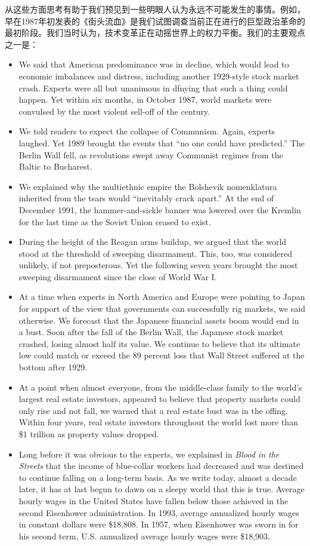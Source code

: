 \begin{paracol}{2}
	\switchcolumn*
	从这些方面思考有助于我们预见到一些明眼人认为永远不可能发生的事情。例如，早在1987年初发表的《街头流血》是我们试图调查当前正在进行的巨型政治革命的最初阶段。我们当时认为，技术变革正在动摇世界上的权力平衡。我们的主要观点之一是：
	
	\switchcolumn
	\begin{itemize}
		\item We said that American predominance was in decline, which would lead to economic imbalances and distress, including another 1929-style stock market crash. Experts were all but unanimous in dfnying that such a thing could happen. Yet within six months, in October 1987, world markets were convulsed by the most violent sell-off of the century.
		\item We told readers to expect the collapse of Communism. Again, experts laughed. Yet 1989 brought the events that ``no one could have predicted.'' The Berlin Wall fell, as revolutions swept away Communist regimes from the Baltic to Bucharest.
		\item We explained why the multiethnic empire the Bolshevik nomenklatura inherited from the tsars would ``inevitably crack apart.'' At the end of December 1991, the hammer-and-sickle banner was lowered over the Kremlin for the last time as the Soviet Union ceased to exist.
		\item During the height of the Reagan arms buildup, we argued that the world stood at the threshold of sweeping disarmament. This, too, was considered unlikely, if not preposterous. Yet the following seven years brought the most sweeping disarmament since the close of World War I.
		\item At a time when experts in North America and Europe were pointing to Japan for support of the view that governments can successfully rig markets, we said otherwise. We forecast that the Japanese financial assets boom would end in a bust. Soon after the fall of the Berlin Wall, the Japanese stock market crashed, losing almost half its value. We continue to believe that its ultimate low could match or exceed the 89 percent loss that Wall Street suffered at the bottom after 1929. 
		\item At a point when almost everyone, from the middle-class family to the world's largest real estate investors, appeared to believe that property markets could only rise and not fall, we warned that a real estate bust was in the offing. Within four years, real estate investors throughout the world lost more than \$1 trillion as property values dropped. 
		\item Long before it was obvious to the experts, we explained in \emph{Blood in the Streets} that the income of blue-collar workers had decreased and was destined to continue falling on a long-term basis. As we write today, almost a decade later, it has at last begun to dawn on a sleepy world that this is true. Average hourly wages in the United States have fallen below those achieved in the second Eisenhower administration. In 1993, average annualized hourly wages in constant dollars were \$18,808. In 1957, when Eisenhower was sworn in for his second term, U.S. annualized average hourly wages were \$18,903.
	\end{itemize}
	


\end{paracol}

